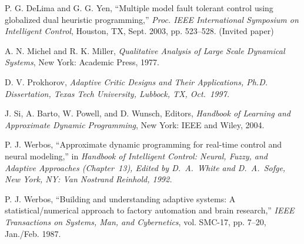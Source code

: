 \documentclass[conference]{IEEEtran}
\begin{document}


%
%
%


\def\V{\rm vol.~}
\def\N{no.~}
\def\pp{pp.~}
\def\Pot{\it Proc. }
\def\IJCNN{\it International Joint Conference on Neural Networks\rm }
\def\ACC{\it American Control Conference\rm }
\def\SMC{\it IEEE Trans. Systems\rm , \it Man\rm , and \it Cybernetics\rm }

\def\handb{ \it Handbook of Intelligent Control: Neural\rm , \it
    Fuzzy\rm , \it and Adaptive Approaches \rm }
                                      
\begin{thebibliography}{1}
 P. G. DeLima and G. G. Yen, 
``Multiple model fault tolerant control using globalized dual 
heuristic programming,''
{\Pot IEEE International Symposium on Intelligent Control}, 
Houston, TX, Sept. 2003, pp. 523--528. (Invited paper) 
                                        
 A. N. Michel and R. K. Miller,
        {\it Qualitative Analysis of Large Scale Dynamical Systems},
        New York: Academic Press, 1977.
	 
  D. V. Prokhorov, \it Adaptive Critic Designs and
    Their Applications\rm  , Ph.D. Dissertation, Texas Tech University,
     Lubbock, TX, Oct.~1997.

 J. Si, A. Barto, W. Powell, and D. Wunsch, Editors,
	{\it Handbook of Learning and Approximate Dynamic Programming}, 
        New York: IEEE and Wiley, 2004.
                                           
 P. J. Werbos, ``Approximate dynamic programming for
    real-time control  and neural modeling,'' in
        \handb (Chapter~13), Edited by D.~A.~White
    and D.~A.~Sofge, New York, NY: Van Nostrand Reinhold, 1992.
                                        
 P. J. Werbos,
``Building and understanding adaptive systems: A statistical/numerical
approach to factory automation and brain research,''
{\it IEEE Transactions on Systems, Man, and Cybernetics},
vol. SMC-17, pp. 7--20, Jan./Feb. 1987.

\end{thebibliography}

\end{document}
